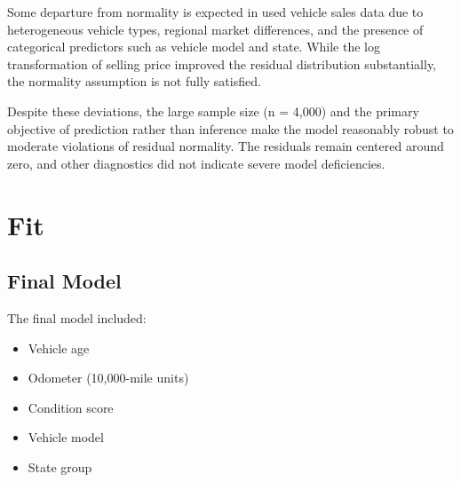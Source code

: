 \documentclass[
  12pt]{article}
\providecommand{\tightlist}{%
  \setlength{\itemsep}{0pt}\setlength{\parskip}{0pt}}
\begin{document}
Some departure from normality is expected in used vehicle sales data due
to heterogeneous vehicle types, regional market differences, and the
presence of categorical predictors such as vehicle model and state.
While the log transformation of selling price improved the residual
distribution substantially, the normality assumption is not fully
satisfied.

Despite these deviations, the large sample size (n = 4,000) and the
primary objective of prediction rather than inference make the model
reasonably robust to moderate violations of residual normality. The
residuals remain centered around zero, and other diagnostics did not
indicate severe model deficiencies.

\section{Fit}\label{sec-fit}

\subsection{Final Model}\label{final-model}

The final model included:

\begin{itemize}
\tightlist
\item
  Vehicle age
\item
  Odometer (10,000-mile units)
\item
  Condition score
\item
  Vehicle model
\item
  State group
\end{itemize}
\end{document}
